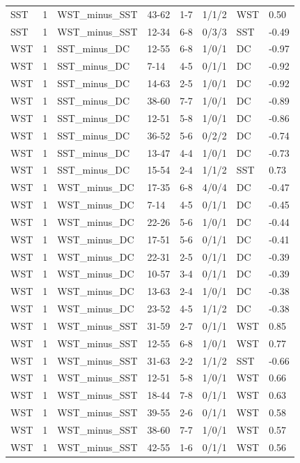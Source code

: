 \begin{table}[!h]
\begin{tabular}[t]{lrllllll}
SST & 1 & WST_minus_SST & 43-62 & 1-7 & 1/1/2 & WST & 0.50\\
SST & 1 & WST_minus_SST & 12-34 & 6-8 & 0/3/3 & SST & -0.49\\
WST & 1 & SST_minus_DC & 12-55 & 6-8 & 1/0/1 & DC & -0.97\\
\addlinespace
WST & 1 & SST_minus_DC & 7-14 & 4-5 & 0/1/1 & DC & -0.92\\
WST & 1 & SST_minus_DC & 14-63 & 2-5 & 1/0/1 & DC & -0.92\\
WST & 1 & SST_minus_DC & 38-60 & 7-7 & 1/0/1 & DC & -0.89\\
WST & 1 & SST_minus_DC & 12-51 & 5-8 & 1/0/1 & DC & -0.86\\
WST & 1 & SST_minus_DC & 36-52 & 5-6 & 0/2/2 & DC & -0.74\\
\addlinespace
WST & 1 & SST_minus_DC & 13-47 & 4-4 & 1/0/1 & DC & -0.73\\
WST & 1 & SST_minus_DC & 15-54 & 2-4 & 1/1/2 & SST & 0.73\\
WST & 1 & WST_minus_DC & 17-35 & 6-8 & 4/0/4 & DC & -0.47\\
WST & 1 & WST_minus_DC & 7-14 & 4-5 & 0/1/1 & DC & -0.45\\
WST & 1 & WST_minus_DC & 22-26 & 5-6 & 1/0/1 & DC & -0.44\\
\addlinespace
WST & 1 & WST_minus_DC & 17-51 & 5-6 & 0/1/1 & DC & -0.41\\
WST & 1 & WST_minus_DC & 22-31 & 2-5 & 0/1/1 & DC & -0.39\\
WST & 1 & WST_minus_DC & 10-57 & 3-4 & 0/1/1 & DC & -0.39\\
WST & 1 & WST_minus_DC & 13-63 & 2-4 & 1/0/1 & DC & -0.38\\
WST & 1 & WST_minus_DC & 23-52 & 4-5 & 1/1/2 & DC & -0.38\\
\addlinespace
WST & 1 & WST_minus_SST & 31-59 & 2-7 & 0/1/1 & WST & 0.85\\
WST & 1 & WST_minus_SST & 12-55 & 6-8 & 1/0/1 & WST & 0.77\\
WST & 1 & WST_minus_SST & 31-63 & 2-2 & 1/1/2 & SST & -0.66\\
WST & 1 & WST_minus_SST & 12-51 & 5-8 & 1/0/1 & WST & 0.66\\
WST & 1 & WST_minus_SST & 18-44 & 7-8 & 0/1/1 & WST & 0.63\\
\addlinespace
WST & 1 & WST_minus_SST & 39-55 & 2-6 & 0/1/1 & WST & 0.58\\
WST & 1 & WST_minus_SST & 38-60 & 7-7 & 1/0/1 & WST & 0.57\\
WST & 1 & WST_minus_SST & 42-55 & 1-6 & 0/1/1 & WST & 0.56\\
\bottomrule
\end{tabular}
\end{table}
